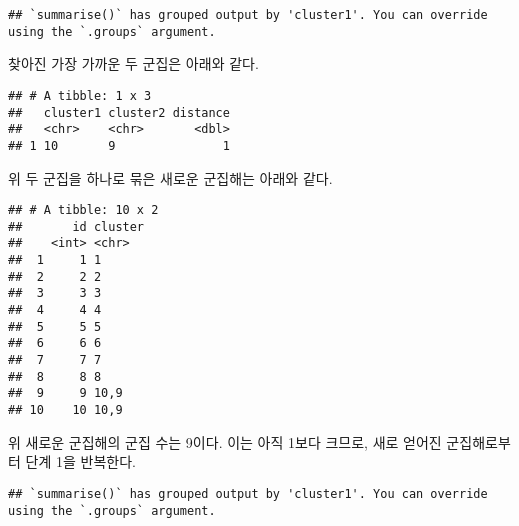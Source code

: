 \documentclass[
]{book}
\newenvironment{Shaded}{\begin{snugshade}}{\end{snugshade}}
\newcommand{\DecValTok}[1]{\textcolor[rgb]{0.00,0.00,0.81}{#1}}
\newcommand{\FunctionTok}[1]{\textcolor[rgb]{0.00,0.00,0.00}{#1}}
\newcommand{\NormalTok}[1]{#1}
\newcommand{\OtherTok}[1]{\textcolor[rgb]{0.56,0.35,0.01}{#1}}
\newcommand{\SpecialCharTok}[1]{\textcolor[rgb]{0.00,0.00,0.00}{#1}}
\begin{document}
\begin{verbatim}
## `summarise()` has grouped output by 'cluster1'. You can override using the `.groups` argument.
\end{verbatim}

찾아진 가장 가까운 두 군집은 아래와 같다.

\begin{Shaded}
\end{Shaded}

\begin{verbatim}
## # A tibble: 1 x 3
##   cluster1 cluster2 distance
##   <chr>    <chr>       <dbl>
## 1 10       9               1
\end{verbatim}

위 두 군집을 하나로 묶은 새로운 군집해는 아래와 같다.

\begin{Shaded}
\end{Shaded}

\begin{verbatim}
## # A tibble: 10 x 2
##       id cluster
##    <int> <chr>  
##  1     1 1      
##  2     2 2      
##  3     3 3      
##  4     4 4      
##  5     5 5      
##  6     6 6      
##  7     7 7      
##  8     8 8      
##  9     9 10,9   
## 10    10 10,9
\end{verbatim}

위 새로운 군집해의 군집 수는 9이다. 이는 아직 1보다 크므로, 새로 얻어진 군집해로부터 단계 1을 반복한다.

\begin{Shaded}
\end{Shaded}

\begin{verbatim}
## `summarise()` has grouped output by 'cluster1'. You can override using the `.groups` argument.
\end{verbatim}
\end{document}
